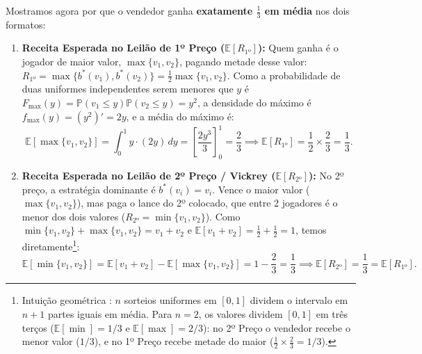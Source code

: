 Mostramos agora por que o vendedor ganha \textbf{exatamente $\frac{1}{3}$ em média} nos dois formatos:
\begin{enumerate}[label=\arabic*.]
    \item \textbf{Receita Esperada no Leilão de 1º Preço ($\mathbb{E}[R_{\text{1º}}]$):} Quem ganha é o jogador de maior valor, $\max\{v_1, v_2\}$, pagando metade desse valor: $R_{\text{1º}} = \max\{b^*(v_1), b^*(v_2)\} = \frac{1}{2}\max\{v_1, v_2\}$. Como a probabilidade de duas uniformes independentes serem menores que $y$ é $F_{\max}(y) = \mathbb{P}(v_1 \le y)\mathbb{P}(v_2 \le y) = y^2$, a densidade do máximo é $f_{\max}(y) = (y^2)' = 2y$, e a média do máximo é:
    \begin{equation}
    \mathbb{E}[\max\{v_1, v_2\}] = \int_0^1 y \cdot (2y)\, dy = \left[\frac{2y^3}{3}\right]_0^1 = \frac{2}{3} \implies \boxed{\mathbb{E}[R_{\text{1º}}] = \frac{1}{2} \times \frac{2}{3} = \frac{1}{3}.}
    \end{equation}

    \item \textbf{Receita Esperada no Leilão de 2º Preço / Vickrey ($\mathbb{E}[R_{\text{2º}}]$):} No 2º preço, a estratégia dominante é $b^*(v_i) = v_i$. Vence o maior valor ($\max\{v_1, v_2\}$), mas paga o lance do 2º colocado, que entre 2 jogadores é o menor dos dois valores ($R_{\text{2º}} = \min\{v_1, v_2\}$). Como $\min\{v_1, v_2\} + \max\{v_1, v_2\} = v_1 + v_2$ e $\mathbb{E}[v_1 + v_2] = \frac{1}{2} + \frac{1}{2} = 1$, temos diretamente\footnote{Intuição geométrica \cite[p.~48]{klemperer2004}: $n$ sorteios uniformes em $[0, 1]$ dividem o intervalo em $n+1$ partes iguais em média. Para $n=2$, os valores dividem $[0, 1]$ em três terços ($\mathbb{E}[\min] = 1/3$ e $\mathbb{E}[\max] = 2/3$): no 2º Preço o vendedor recebe o menor valor ($1/3$), e no 1º Preço recebe metade do maior ($\frac{1}{2} \times \frac{2}{3} = 1/3$).}:
    \begin{equation}
    \mathbb{E}[\min\{v_1, v_2\}] = \mathbb{E}[v_1 + v_2] - \mathbb{E}[\max\{v_1, v_2\}] = 1 - \frac{2}{3} = \frac{1}{3} \implies \boxed{\mathbb{E}[R_{\text{2º}}] = \frac{1}{3} = \mathbb{E}[R_{\text{1º}}].}
    \end{equation}
\end{enumerate}
